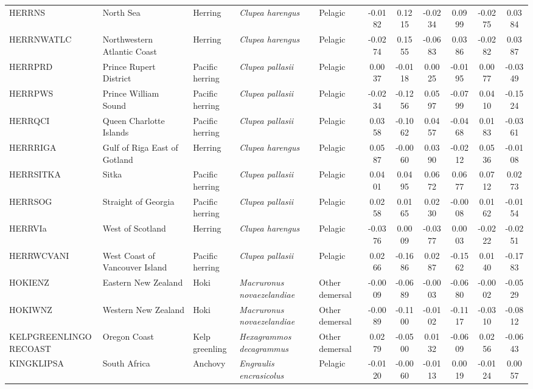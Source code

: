 \begin{longtable}{p{3cm}p{3cm}lllcccccc}
  HERRNS & North Sea & Herring & \textit{Clupea harengus} & Pelagic & -0.0182 & 0.1215 & -0.0234 & 0.0999 & -0.0275 & 0.0384 \\
  HERRNWATLC & Northwestern Atlantic Coast & Herring & \textit{Clupea harengus} & Pelagic & -0.0274 & 0.1555 & -0.0683 & 0.0386 & -0.0282 & 0.0387 \\
  HERRPRD & Prince Rupert District & Pacific herring & \textit{Clupea pallasii} & Pelagic & 0.0037 & -0.0118 & 0.0025 & -0.0195 & 0.0077 & -0.0349 \\
  HERRPWS & Prince William Sound & Pacific herring & \textit{Clupea pallasii} & Pelagic & -0.0234 & -0.1256 & 0.0597 & -0.0799 & 0.0410 & -0.1524 \\
  HERRQCI & Queen Charlotte Islands & Pacific herring & \textit{Clupea pallasii} & Pelagic & 0.0358 & -0.1062 & 0.0457 & -0.0468 & 0.0183 & -0.0361 \\
  HERRRIGA & Gulf of Riga East of Gotland & Herring & \textit{Clupea harengus} & Pelagic & 0.0587 & -0.0060 & 0.0390 & -0.0212 & 0.0536 & -0.0108 \\
  HERRSITKA & Sitka & Pacific herring & \textit{Clupea pallasii} & Pelagic & 0.0401 & 0.0495 & 0.0672 & 0.0677 & 0.0712 & 0.0273 \\
  HERRSOG & Straight of Georgia & Pacific herring & \textit{Clupea pallasii} & Pelagic & 0.0258 & 0.0165 & 0.0230 & -0.0008 & 0.0162 & -0.0154 \\
  HERRVIa & West of Scotland & Herring & \textit{Clupea harengus} & Pelagic & -0.0376 & 0.0009 & -0.0377 & 0.0003 & -0.0222 & -0.0251 \\
  HERRWCVANI & West Coast of Vancouver Island & Pacific herring & \textit{Clupea pallasii} & Pelagic & 0.0266 & -0.1686 & 0.0287 & -0.1562 & 0.0140 & -0.1783 \\
  HOKIENZ & Eastern New Zealand & Hoki & \textit{Macruronus novaezelandiae} & Other demersal & -0.0009 & -0.0689 & -0.0003 & -0.0680 & -0.0002 & -0.0529 \\
  HOKIWNZ & Western New Zealand & Hoki & \textit{Macruronus novaezelandiae} & Other demersal & -0.0089 & -0.1100 & -0.0102 & -0.1117 & -0.0310 & -0.0812 \\
  KELPGREENLINGORECOAST & Oregon Coast & Kelp greenling & \textit{Hexagrammos decagrammus} & Other demersal & 0.0279 & -0.0500 & 0.0132 & -0.0609 & 0.0256 & -0.0643 \\
  KINGKLIPSA & South Africa & Anchovy & \textit{Engraulis encrasicolus} & Pelagic & -0.0120 & -0.0060 & -0.0113 & 0.0019 & -0.0124 & 0.0057 \\

\end{longtable}
